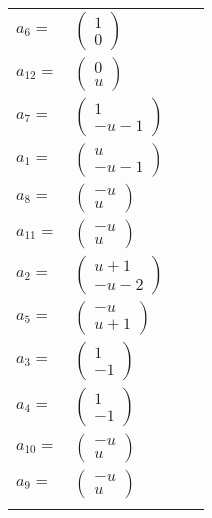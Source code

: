 \documentclass[1p]{elsarticle_modified}
\theoremstyle{definition}
\begin{document}
\begin{tabular}{m{7pt} m{180pt} m{7pt} m{180pt} }
\flushright $a_{6}=$&$\begin{pmatrix}1\\0\end{pmatrix}$ \\
\flushright $a_{12}=$&$\begin{pmatrix}0\\u\end{pmatrix}$ \\
\flushright $a_{7}=$&$\begin{pmatrix}1\\- u-1\end{pmatrix}$ \\
\flushright $a_{1}=$&$\begin{pmatrix}u\\- u-1\end{pmatrix}$ \\
\flushright $a_{8}=$&$\begin{pmatrix}- u\\u\end{pmatrix}$ \\
\flushright $a_{11}=$&$\begin{pmatrix}- u\\u\end{pmatrix}$ \\
\flushright $a_{2}=$&$\begin{pmatrix}u+1\\- u-2\end{pmatrix}$ \\
\flushright $a_{5}=$&$\begin{pmatrix}- u\\u+1\end{pmatrix}$ \\
\flushright $a_{3}=$&$\begin{pmatrix}1\\-1\end{pmatrix}$ \\
\flushright $a_{4}=$&$\begin{pmatrix}1\\-1\end{pmatrix}$ \\
\flushright $a_{10}=$&$\begin{pmatrix}- u\\u\end{pmatrix}$ \\
\flushright $a_{9}=$&$\begin{pmatrix}- u\\u\end{pmatrix}$\\&\end{tabular}
\end{document}
